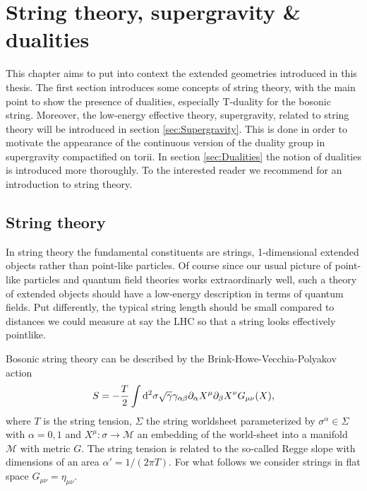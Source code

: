\chapter{String theory, supergravity \& dualities\label{chap:StringTheory}}


This chapter aims to put into context the extended geometries introduced in this thesis. The first section introduces some concepts of string theory, with the main point to show the presence of dualities, especially T-duality for the bosonic string. Moreover, the low-energy effective theory, supergravity, related to string theory will be introduced in section \ref{sec:Supergravity}. This is done in order to motivate the appearance of the continuous version of the duality group in supergravity compactified on torii. In section \ref{sec:Dualities} the notion of dualities is introduced more thoroughly. To the interested reader we recommend \cite{Blumenhagen2013,TongLectureNotes} for an introduction to string theory.


\section{String theory}
In string theory the fundamental constituents are strings, 1-dimensional extended objects rather than point-like particles. Of course since our usual picture of point-like particles and quantum field theories works extraordinarly well, such a theory of extended objects should have a low-energy description in terms of quantum fields. Put differently, the typical string length should be small compared to distances we could measure at say the LHC so that a string looks effectively pointlike. 

Bosonic string theory can be described by the Brink-Howe-Vecchia-Polyakov action
\begin{equation}
    S = -\frac{T}{2}\int \mathrm{d}^2\sigma \sqrt{\gamma}\gamma_{\alpha\beta}\partial_\alpha X^\mu\partial_\beta X^\nu G_{\mu\nu}(X),
\end{equation}
where $T$ is the string tension, $\Sigma$ the string worldsheet parameterized by $\sigma^{\alpha}\in\Sigma$ with $\alpha=0,1$ and $X^\mu: \sigma \to \mathcal{M}$  an embedding of the world-sheet into a manifold $\mathcal{M}$ with metric $G$. The string tension is related to the so-called Regge slope with dimensions of an area $\alpha'= 1/(2\pi T)$. For what follows we consider strings in flat space $G_{\mu\nu}=\eta_{\mu\nu}$. 

